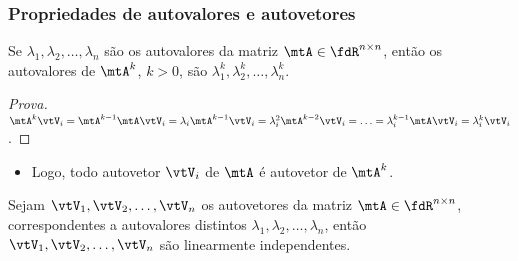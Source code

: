 \begin{frame}
  \frametitle{Propriedades de autovalores e autovetores}
  \begin{propriedade}
    Se $\lambda_1, \lambda_2, \ldots, \lambda_n$ são os autovalores da matriz $\mtA \in \fdR^{n \times n}$, então os autovalores de $\mtA^k$, $k > 0$, são $\lambda^k_1, \lambda^k_2, \ldots, \lambda^k_n$.
  \end{propriedade}
  \vfill
  \begin{proof}[Prova]
    $\mtA^k \vtV_i =  \mtA^{k-1} \mtA \vtV_i = \lambda_i \mtA^{k-1} \vtV_i = \lambda^2_i \mtA^{k-2} \vtV_i = \ldots = \lambda^{k-1}_i \mtA \vtV_i = \lambda^{k}_i \vtV_i$.
  \end{proof}
  \vfill
  \begin{itemize}
    \item Logo, todo autovetor $\vtV_i$ de $\mtA$ é autovetor de $\mtA^k$.
  \end{itemize}
  \vfill
  \begin{propriedade}
    Sejam  $\vtV_1, \vtV_2, \ldots, \vtV_n$ os autovetores da matriz $\mtA \in \fdR^{n \times n}$, correspondentes a autovalores distintos $\lambda_1, \lambda_2, \ldots, \lambda_n$, então $\vtV_1, \vtV_2, \ldots, \vtV_n$ são linearmente independentes.
  \end{propriedade}
\end{frame}

